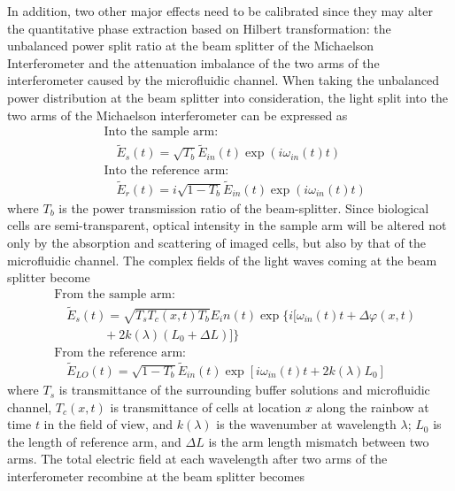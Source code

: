 \documentclass[aps,pra,reprint,superscriptaddress]{revtex4-1}
\begin{document}
In addition, two other major effects need to be calibrated since they may alter the quantitative phase extraction based on Hilbert transformation: the unbalanced power split ratio at the beam splitter of the Michaelson Interferometer and the attenuation imbalance of the two arms of the interferometer caused by the microfluidic channel. When taking the unbalanced power distribution at the beam splitter into consideration, the light split into the two arms of the Michaelson interferometer can be expressed as
\begin{equation}
\begin{split}
&\text{Into the sample arm:} \\
&\quad \tilde{E}_s(t) = \sqrt{T_b} \tilde{E}_{in}(t) \exp(i\omega_{in}(t) t)  \\
&\text{Into the reference arm:} \\
&\quad \tilde{E}_r(t) = i \sqrt{1-T_b} \tilde{E}_{in}(t) \exp(i\omega_{in}(t) t) 
\end{split}
\end{equation}
where $T_b$ is the power transmission ratio of the beam-splitter. Since biological cells are semi-transparent, optical intensity in the sample arm will be altered not only by the absorption and scattering of imaged cells, but also by that of the microfluidic channel. The complex fields of the light waves coming at the beam splitter become
\begin{equation}
\begin{split}
&\text{From the sample arm:}\\
&\quad \tilde{E}_s(t) = \sqrt{T_s T_c(x,t) T_b} E_in(t) \exp \lbrace i[\omega_{in}(t) t + \Delta\varphi(x,t) \\
&\quad\quad\quad\quad + 2 k(\lambda) (L_0 + \Delta L)] \rbrace\\
&\text{From the reference arm:} \\
&\quad \tilde{E}_{LO}(t) = \sqrt{1-T_b} \tilde{E}_{in}(t) \exp[i\omega_{in}(t) t + 2 k(\lambda) L_0]
\end{split}
\end{equation}
where $T_s$ is transmittance of the surrounding buffer solutions and microfluidic channel, $T_c(x,t)$ is transmittance of cells at location $x$ along the rainbow at time $t$ in the field of view, and $k(\lambda)$ is the wavenumber at wavelength $\lambda$; $L_0$ is the length of reference arm, and $\Delta L$ is the arm length mismatch between two arms. The total electric field at each wavelength after two arms of the interferometer recombine at the beam splitter becomes
\end{document}

